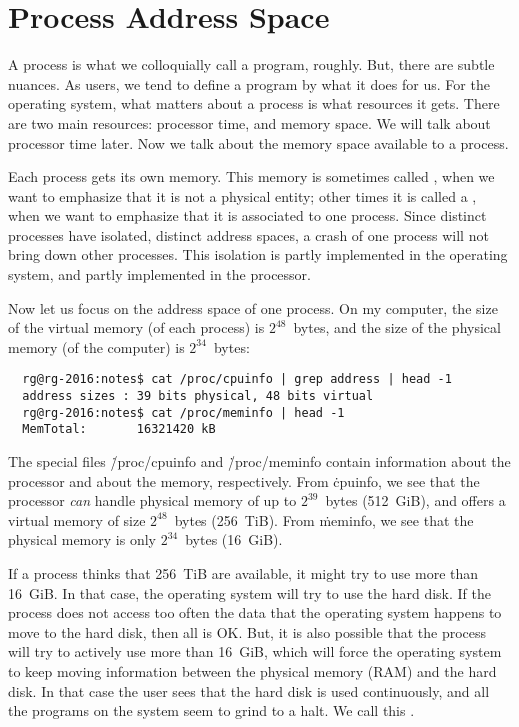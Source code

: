 



\section*{Process Address Space}


A process is what we colloquially call a program, roughly.
But, there are subtle nuances.
As users, we tend to define a program by what it does for us.
For the operating system,
  what matters about a process is what resources it gets.
There are two main resources: processor time, and memory space.
We will talk about processor time later.
Now we talk about the memory space available to a process.

Each process gets its own memory.
This memory is sometimes called ,
  when we want to emphasize that it is not a physical entity;
other times it is called a ,
  when we want to emphasize that it is associated to one process.
Since distinct processes have isolated, distinct address spaces,
  a crash of one process will not bring down other processes.
This isolation is partly implemented in the operating system,
  and partly implemented in the processor.

Now let us focus on the address space of one process.
On my computer,
  the size of the virtual memory (of each process) is $2^{48}$~bytes,
  and the size of the physical memory (of the computer) is $2^{34}$~bytes:
\begin{verbatim}
  rg@rg-2016:notes$ cat /proc/cpuinfo | grep address | head -1
  address sizes	: 39 bits physical, 48 bits virtual
  rg@rg-2016:notes$ cat /proc/meminfo | head -1
  MemTotal:       16321420 kB
\end{verbatim}
The special files \.{/proc/cpuinfo} and \.{/proc/meminfo}
  contain information about the processor and about the memory, respectively.
From \.{cpuinfo},
  we see that the processor \emph{can} handle physical memory
    of up to $2^{39}$~bytes (512~GiB),
  and offers a virtual memory of size $2^{48}$~bytes (256~TiB).
From \.{meminfo},
  we see that the physical memory is only $2^{34}$~bytes (16~GiB).

If a process thinks that 256~TiB are available,
  it might try to use more than 16~GiB\null.
In that case, the operating system will try to use the hard disk.
If the process does not access too often the data that the operating system
  happens to move to the hard disk,
  then all is OK\null.
But, it is also possible that the process will try to actively use
  more than 16~GiB,
  which will force the operating system to keep moving information
    between the physical memory (RAM) and the hard disk.
In that case the user sees that the hard disk is used continuously,
  and all the programs on the system seem to grind to a halt.
We call this .

